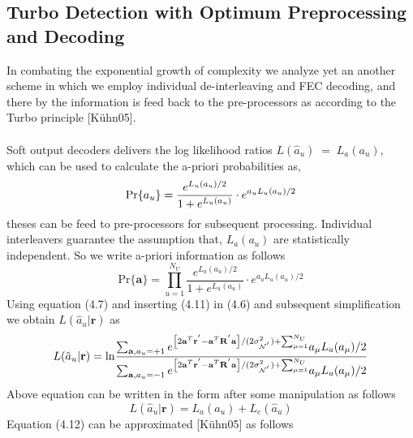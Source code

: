 \subsection{Turbo Detection with Optimum Preprocessing and Decoding}
In combating the exponential growth of complexity we analyze yet an another scheme in which we employ individual de-interleaving and FEC decoding, and there by the information is feed back to the pre-processors as according to the Turbo principle [K\"uhn05]. \\ \\
Soft output decoders delivers the log likelihood ratios $L(\hat{a}_u)\;=\;L_a(a_u)$, which can be used to calculate the a-priori probabilities as,
\begin{equation}
\mathrm{Pr}\{a_u\}=\frac{\hbox{$e^{L_u(a_u)/2}$}}{\hbox{$1+e^{L_u(a_u)}$}}\cdot e^{a_uL_u(a_u)/2}
\end{equation}
theses can be feed to pre-processors for subsequent processing. Individual interleavers guarantee the assumption that, $L_a(a_u)$ are statistically independent. So we write a-priori information as follows
\begin{equation}
\mathrm{Pr}\{\mathrm{\mathbf{a}}\}=\prod\limits_{u=1}^{N_U}\frac{e^{L_a(a_u)/2}}{1+e^{L_u(a_u)}}\cdot e^{a_uL_u(a_u)/2}
\end{equation}
Using equation (4.7) and inserting (4.11) in (4.6) and subsequent simplification we obtain $L(\hat{a}_u\vert \mathrm{\mathbf{r}})$ as
\begin{equation}
L(\hat{a}_u\vert \mathrm{\mathbf{r}})=
\mathrm{ln}
\frac
{
\hbox{$\sum_{\mathrm{\mathbf{a}},a_u=+1}e^{\left[2\mathrm{\mathbf{a}}^T\mathrm{\mathbf{r}}^{'}-\mathrm{\mathbf{a}}^{T}\mathrm{\mathbf{R}}^{'}\mathrm{\mathbf{a}}\right]/(2\sigma^2_{\mathcal{N}^{'}})+\sum_{\mu = 1}^{N_U}}a_{\mu}L_a(a_{\mu})/2$}
}
{
\hbox{$\sum_{\mathrm{\mathbf{a}},a_u=-1}e^{\left[2\mathrm{\mathbf{a}}^T\mathrm{\mathbf{r}}^{'}-\mathrm{\mathbf{a}}^{T}\mathrm{\mathbf{R}}^{'}\mathrm{\mathbf{a}}\right]/(2\sigma^2_{\mathcal{N}^{'}})+\sum_{\mu = 1}^{N_U}}a_{\mu}L_a(a_{\mu})/2$}
}
\end{equation}
Above equation can be written in the form after some manipulation as follows
\begin{equation}
L(\hat{a}_u\vert \mathrm{\mathbf{r}})=L_a(a_u)+L_e(\hat{a}_u)
\end{equation}
Equation (4.12) can be approximated [K\"uhn05] as follows
